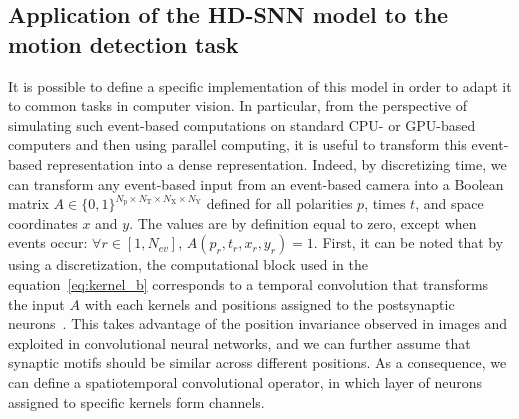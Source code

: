 \documentclass[default]{sn-jnl}%
\theoremstyle{thmstyleone}%
\theoremstyle{thmstyletwo}%
\theoremstyle{thmstylethree}%
\newcommand{\numevent}{N_{ev}} %
\newcommand{\Npol}{N_\text{p}} %
\newcommand{\arank}{r} %
\newcommand{\polev}{p} %
\newcommand{\Nx}{N_\text{X}}
\newcommand{\Ny}{N_\text{Y}}
\newcommand{\Ntime}{N_\text{T}}
\begin{document}
\subsection{Application of the HD-SNN model to the motion detection task}
%
It is possible to define a specific implementation of this model in order to adapt it to common tasks in computer vision. In particular, from the perspective of simulating such event-based computations on standard CPU- or GPU-based computers and then using parallel computing, it is useful to transform this event-based representation into a dense representation. Indeed, by discretizing time, we can transform any event-based input from an event-based camera into a Boolean matrix $A \in \{0, 1 \}^{\Npol \times \Ntime \times \Nx \times \Ny}$ defined for all polarities $p$, times $t$, and space coordinates $x$ and $y$. The values are by definition equal to zero, except when events occur: $\forall \arank \in [1,\numevent]$, $A(\polev_\arank, t_\arank, x_\arank, y_\arank)=1$. First, it can be noted that by using a discretization, the computational block used in the equation~\eqref{eq:kernel_b} corresponds to a temporal convolution that transforms the input $A$ with each kernels and positions assigned to the postsynaptic neurons~\citep{grimaldi_learning_2022}. This takes advantage of the position invariance observed in images and exploited in convolutional neural networks, and we can further assume that synaptic motifs should be similar across different positions. As a consequence, we can define a spatiotemporal convolutional operator, in which layer of neurons assigned to specific kernels form channels.
\end{document}
